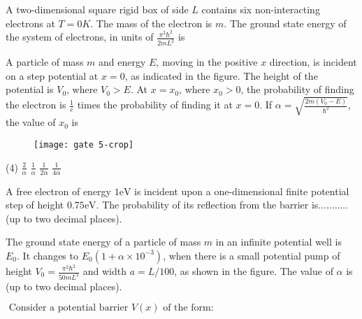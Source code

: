 \begin{enumerate}
\begin{minipage}{\textwidth}
\end{minipage}
\begin{minipage}{\textwidth}
	\item A two-dimensional square rigid box of side $L$ contains six non-interacting electrons at $T=0 K .$ The mass of the electron is $m .$ The ground state energy of the system of electrons, in units of $\frac{\pi^{2} \hbar^{2}}{2 m L^{2}}$ is
\end{minipage}
\begin{minipage}{\textwidth}
	\item A particle of mass $m$ and energy $E$, moving in the positive $x$ direction, is incident on a step potential at $x=0$, as indicated in the figure. The height of the potential is $V_{0}$, where $V_{0}>E$. At $x=x_{0}$, where $x_{0}>0$, the probability of finding the electron is $\frac{1}{e}$ times the probability of finding it at $x=0$. If $\alpha=\sqrt{\frac{2 m\left(V_{0}-E\right)}{\hbar^{2}}}$, the value of $x_{0}$ is
	\begin{figure}[H]
		\centering
		\texttt{[image: gate 5-crop]}
	\end{figure}
\end{minipage}
\begin{tasks}(4)
	\task[\textbf{A.}] $\frac{2}{\alpha}$
	\task[\textbf{B.}] $\frac{1}{\alpha}$
	\task[\textbf{C.}]$\frac{1}{2 \alpha}$
	\task[\textbf{D.}]$\frac{1}{4 \alpha}$
\end{tasks}
\begin{minipage}{\textwidth}
	\item A free electron of energy $1 \mathrm{eV}$ is incident upon a one-dimensional finite potential step of height $0.75 \mathrm{eV}$. The probability of its reflection from the barrier is........... (up to two decimal places).
\end{minipage}
\begin{minipage}{\textwidth}
	\item The ground state energy of a particle of mass $m$ in an infinite potential well is $E_{0} .$ It changes to $E_{0}\left(1+\alpha \times 10^{-3}\right)$, when there is a small potential pump of height $V_{0}=\frac{\pi^{2} \hbar^{2}}{50 m L^{2}}$ and width $a=L / 100$, as shown in the figure. The value of $\alpha$ is (up to two decimal places).
\end{minipage}
\begin{minipage}{\textwidth}
	\item $ \text { Consider a potential barrier } V(x) \text { of the form: }$

\end{minipage}
\end{enumerate}
